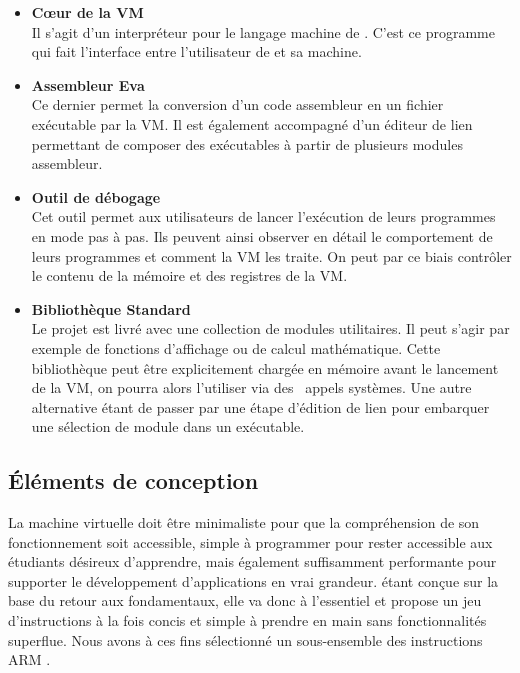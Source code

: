\documentclass[11pt,twoside]{article}
\begin{document}
\begin{itemize}
  \item \textbf{Cœur de la VM} \\
        Il s'agit d'un interpréteur pour le langage machine de . C'est ce programme qui fait l'interface entre l'utilisateur de  et sa machine.

  \item \textbf{Assembleur Eva} \\
        Ce dernier permet la conversion d'un code assembleur en un fichier exécutable par la VM. Il est également accompagné d'un éditeur de lien permettant de composer des exécutables à partir de plusieurs modules assembleur.

  \item \textbf{Outil de débogage} \\
        Cet outil permet aux utilisateurs de lancer l’exécution de leurs programmes en mode pas à pas. Ils peuvent ainsi observer en détail le comportement de leurs programmes et comment la VM les traite. On peut par ce biais contrôler le contenu de la mémoire et des registres de la VM.


  \item \textbf{Bibliothèque Standard} \\
        Le projet  est livré avec une collection de modules utilitaires. Il peut s'agir par exemple de fonctions d'affichage ou de calcul mathématique. Cette bibliothèque peut être explicitement chargée en mémoire avant le lancement de la VM, on pourra alors l'utiliser via des \og~appels systèmes\fg. Une autre alternative étant de passer par une étape d'édition de lien pour embarquer une sélection de module dans un exécutable.

\end{itemize}



\subsection{Éléments de conception}

La machine virtuelle doit être minimaliste pour que la compréhension de son fonctionnement soit accessible, simple à programmer pour rester accessible aux étudiants désireux d'apprendre, mais également suffisamment performante pour supporter le développement d'applications en vrai grandeur.  étant conçue sur la base du \og retour aux fondamentaux\fg , elle va donc à l'essentiel et propose un jeu d'instructions à la fois concis et simple à prendre en main sans fonctionnalités superflue. Nous avons à ces fins sélectionné un sous-ensemble des instructions ARM .
\end{document}
